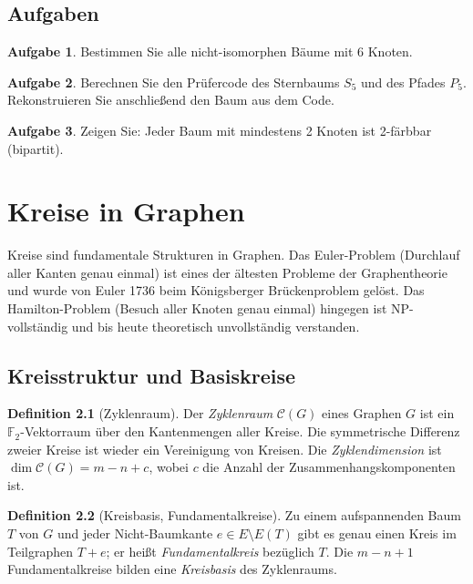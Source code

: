 ﻿\documentclass[a4paper,12pt,openany,oneside]{book}
\theoremstyle{definition}
\newtheorem{definition}{Definition}[chapter]
\newtheorem{aufgabe}{Aufgabe}[chapter]
\theoremstyle{plain}
\theoremstyle{remark}
\begin{document}
\section{Aufgaben}

\begin{aufgabe}
  Bestimmen Sie alle nicht-isomorphen B\"aume mit 6 Knoten.
\end{aufgabe}

\begin{aufgabe}
  Berechnen Sie den Pr\"ufercode des Sternbaums $S_5$ und des Pfades $P_5$.
  Rekonstruieren Sie anschlie\ss{}end den Baum aus dem Code.
\end{aufgabe}

\begin{aufgabe}
  Zeigen Sie: Jeder Baum mit mindestens 2 Knoten ist 2-f\"arbbar (bipartit).
\end{aufgabe}

\chapter{Kreise in Graphen}

Kreise sind fundamentale Strukturen in Graphen. Das Euler-Problem
(Durchlauf aller Kanten genau einmal) ist eines der \"altesten Probleme der
Graphentheorie und wurde von Euler 1736 beim K\"onigsberger Br\"uckenproblem
gel\"ost. Das Hamilton-Problem (Besuch aller Knoten genau einmal) hingegen
ist NP-vollst\"andig und bis heute theoretisch unvollst\"andig verstanden.

\section{Kreisstruktur und Basiskreise}

\begin{definition}[Zyklenraum]
  Der \emph{Zyklenraum} $\mathcal{C}(G)$ eines Graphen $G$ ist ein
  $\mathbb{F}_2$-Vektorraum \"uber den Kantenmengen aller Kreise. Die
  symmetrische Differenz zweier Kreise ist wieder ein Vereinigung von Kreisen.
  Die \emph{Zyklendimension} ist $\dim \mathcal{C}(G) = m - n + c$, wobei
  $c$ die Anzahl der Zusammenhangskomponenten ist.
\end{definition}

\begin{definition}[Kreisbasis, Fundamentalkreise]
  Zu einem aufspannenden Baum $T$ von $G$ und jeder
  Nicht-Baumkante $e \in E \setminus E(T)$ gibt es genau einen Kreis im
  Teilgraphen $T + e$; er hei\ss{}t \emph{Fundamentalkreis} bez\"uglich $T$.
  Die $m - n + 1$ Fundamentalkreise bilden eine \emph{Kreisbasis} des
  Zyklenraums.
\end{definition}
\end{document}
